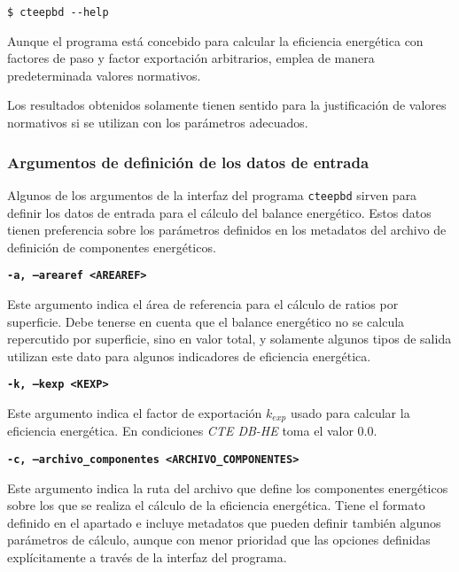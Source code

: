\documentclass[10pt,notitlepage,oneside,a4paper]{article}
\begin{document}
\begin{Verbatim}[fontsize=\small]
	$ cteepbd --help
\end{Verbatim}


\begin{myquote}\footnotesize
Aunque el programa está concebido para calcular la eficiencia energética con factores de paso y factor exportación arbitrarios, emplea de manera predeterminada valores normativos.

Los resultados obtenidos solamente tienen sentido para la justificación de valores normativos si se utilizan con los parámetros adecuados.
\end{myquote}

\subsubsection{Argumentos de definición de los datos de entrada}

Algunos de los argumentos de la interfaz del programa \texttt{cteepbd} sirven para definir los datos de entrada para el cálculo del balance energético. Estos datos tienen preferencia sobre los parámetros definidos en los metadatos del archivo de definición de componentes energéticos.

\textbf{\texttt{-a, --arearef <AREAREF>}}

Este argumento indica el área de referencia para el cálculo de ratios por superficie. Debe tenerse en cuenta que el balance energético no se calcula repercutido por superficie, sino en valor total, y solamente algunos tipos de salida utilizan este dato para algunos indicadores de eficiencia energética.

\textbf{\texttt{-k, --kexp <KEXP>}}

Este argumento indica el factor de exportación $k_{exp}$ usado para calcular la eficiencia energética. En condiciones \textit{CTE DB-HE} toma el valor $0.0$.

\textbf{\texttt{-c, --archivo\_componentes <ARCHIVO\_COMPONENTES>}}

Este argumento indica la ruta del archivo que define los componentes energéticos sobre los que se realiza el cálculo de la eficiencia energética. Tiene el formato definido en el apartado  e incluye metadatos que pueden definir también algunos parámetros de cálculo, aunque con menor prioridad que las opciones definidas explícitamente a través de la interfaz del programa.
\end{document}
